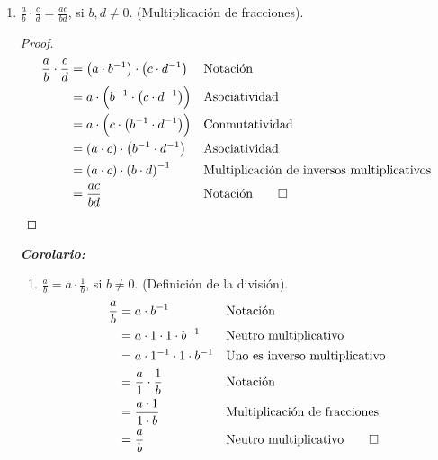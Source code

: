 \documentclass[11pt]{article}
\newcommand{\bfit}[1]{\textbf{\textit{#1}}}
\begin{document}
\begin{enumerate}[label=\alph*)]
    \item $\frac{a}{b} \cdot \frac{c}{d} = \frac{ac}{bd}$, si $b, d \neq 0$. (Multiplicación de fracciones).
    \vspace{-1em}\begin{proof} 
        \begin{align*}
            \frac{a}{b} \cdot \frac{c}{d} &= \left( a \cdot b^{-1} \right) \cdot \left( c \cdot d^{-1} \right) && \text{Notación}\\
                &= a \cdot \Bigl( b^{-1} \cdot \left( c \cdot d^{-1} \right) \Bigr) && \text{Asociatividad}\\
                    &= a \cdot \Bigl( c \cdot \left( b^{-1} \cdot d^{-1} \right) \Bigr) && \text{Conmutatividad}\\
            &= \left( a \cdot c \right) \cdot \left( b^{-1} \cdot d^{-1} \right) && \text{Asociatividad}\\
            &= \left( a \cdot c \right) \cdot \left( b \cdot d \right)^{-1} && \text{Multiplicación de inversos multiplicativos}\\
            &= \frac{ac}{bd} && \text{Notación} \qedhere
        \end{align*}    
    \end{proof} \vspace{-1em}

    \bfit{Corolario:}\begin{enumerate}[label=\roman*)]
        \item $\frac{a}{b}=a\cdot \frac{1}{b}$, si $b\neq 0$. (Definición de la división).
        \begin{align*}
            \frac{a}{b} &= a\cdot b^{-1} && \text{Notación}\\
            &= a\cdot 1 \cdot 1\cdot b^{-1}&& \text{Neutro multiplicativo}\\
            &= a \cdot 1^{-1} \cdot 1\cdot b^{-1} && \text{Uno es inverso multiplicativo}\\
            &= \frac{a}{1} \cdot \frac{1}{b} && \text{Notación}\\
            &= \frac{a\cdot 1}{1\cdot b} && \text{Multiplicación de fracciones}\\
            &= \frac{a}{b} && \text{Neutro multiplicativo} \qedhere
        \end{align*}


\end{enumerate}
\end{enumerate}
\end{document}

